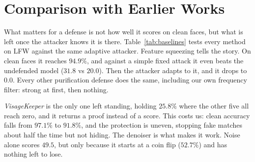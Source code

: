 \section{Comparison with Earlier Works}

What matters for a defense is not how well it scores on clean faces, but
what is left once the attacker knows it is there. Table~\ref{tab:baselines}
tests every method on LFW against the same adaptive attacker. Feature
squeezing tells the story. On clean faces it reaches $94.9\%$, and against
a simple fixed attack it even beats the undefended model ($31.8$ vs
$20.0$). Then the attacker adapts to it, and it drops to $0.0$. Every
other purification defense does the same, including our own frequency
filter: strong at first, then nothing.

\textit{VisageKeeper} is the only one left standing, holding $25.8\%$
where the other five all reach zero, and it returns a proof instead of a
score. This costs us: clean accuracy falls from $97.1\%$ to $91.8\%$, and
the protection is uneven, stopping fake matches about half the time but
not hiding. The denoiser is what makes it work. Noise alone scores $49.5$,
but only because it starts at a coin flip ($52.7\%$) and has nothing left
to lose.
